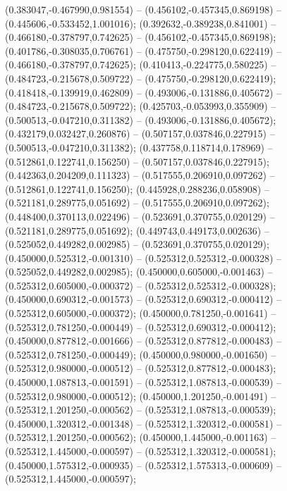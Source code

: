  (0.383047,-0.467990,0.981554) -- (0.456102,-0.457345,0.869198) -- (0.445606,-0.533452,1.001016);
 (0.392632,-0.389238,0.841001) -- (0.466180,-0.378797,0.742625) -- (0.456102,-0.457345,0.869198);
 (0.401786,-0.308035,0.706761) -- (0.475750,-0.298120,0.622419) -- (0.466180,-0.378797,0.742625);
 (0.410413,-0.224775,0.580225) -- (0.484723,-0.215678,0.509722) -- (0.475750,-0.298120,0.622419);
 (0.418418,-0.139919,0.462809) -- (0.493006,-0.131886,0.405672) -- (0.484723,-0.215678,0.509722);
 (0.425703,-0.053993,0.355909) -- (0.500513,-0.047210,0.311382) -- (0.493006,-0.131886,0.405672);
 (0.432179,0.032427,0.260876) -- (0.507157,0.037846,0.227915) -- (0.500513,-0.047210,0.311382);
 (0.437758,0.118714,0.178969) -- (0.512861,0.122741,0.156250) -- (0.507157,0.037846,0.227915);
 (0.442363,0.204209,0.111323) -- (0.517555,0.206910,0.097262) -- (0.512861,0.122741,0.156250);
 (0.445928,0.288236,0.058908) -- (0.521181,0.289775,0.051692) -- (0.517555,0.206910,0.097262);
 (0.448400,0.370113,0.022496) -- (0.523691,0.370755,0.020129) -- (0.521181,0.289775,0.051692);
 (0.449743,0.449173,0.002636) -- (0.525052,0.449282,0.002985) -- (0.523691,0.370755,0.020129);
 (0.450000,0.525312,-0.001310) -- (0.525312,0.525312,-0.000328) -- (0.525052,0.449282,0.002985);
 (0.450000,0.605000,-0.001463) -- (0.525312,0.605000,-0.000372) -- (0.525312,0.525312,-0.000328);
 (0.450000,0.690312,-0.001573) -- (0.525312,0.690312,-0.000412) -- (0.525312,0.605000,-0.000372);
 (0.450000,0.781250,-0.001641) -- (0.525312,0.781250,-0.000449) -- (0.525312,0.690312,-0.000412);
 (0.450000,0.877812,-0.001666) -- (0.525312,0.877812,-0.000483) -- (0.525312,0.781250,-0.000449);
 (0.450000,0.980000,-0.001650) -- (0.525312,0.980000,-0.000512) -- (0.525312,0.877812,-0.000483);
 (0.450000,1.087813,-0.001591) -- (0.525312,1.087813,-0.000539) -- (0.525312,0.980000,-0.000512);
 (0.450000,1.201250,-0.001491) -- (0.525312,1.201250,-0.000562) -- (0.525312,1.087813,-0.000539);
 (0.450000,1.320312,-0.001348) -- (0.525312,1.320312,-0.000581) -- (0.525312,1.201250,-0.000562);
 (0.450000,1.445000,-0.001163) -- (0.525312,1.445000,-0.000597) -- (0.525312,1.320312,-0.000581);
 (0.450000,1.575312,-0.000935) -- (0.525312,1.575313,-0.000609) -- (0.525312,1.445000,-0.000597);
